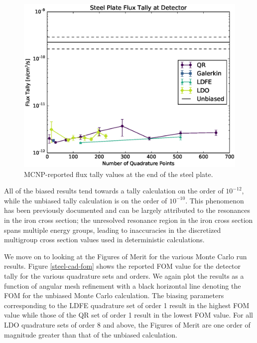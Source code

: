 \documentclass{article} %
\begin{document}
\begin{figure}[!hbt]
\centering
\includegraphics[max height=0.445\textheight]{img/steel-cadis-tally.eps}
\caption{MCNP-reported flux tally values at the end of the steel plate.}
\label{steel-cad-tally}
\end{figure}

All of the biased results tend towards a tally calculation on the order of
$10^{-12}$, while the unbiased tally calculation is on the order of
$10^{-10}$. This phenomenon has been previously documented
\cite{wilsonslaybaugh} and can be largely attributed to the resonances in the
iron cross section; the unresolved resonance region in the iron cross section
spans multiple energy groups, leading to inaccuracies in the discretized
multigroup cross section values used in deterministic calculations.

We move on to looking at the Figures of Merit for the various Monte Carlo run
results. Figure \ref{steel-cad-fom} shows the reported FOM value for the
detector tally for the various quadrature sets and orders. We again plot the
results as a function of angular mesh refinement with a black horizontal line
denoting the FOM for the unbiased Monte Carlo calculation. The biasing
parameters corresponding to the LDFE quadrature set of order 1 result in the
highest FOM value while those of the QR set of order 1 result in the lowest
FOM value. For all LDO quadrature sets of order 8 and above, the Figures of
Merit are one order of magnitude greater than that of the unbiased
calculation.
\end{document}
